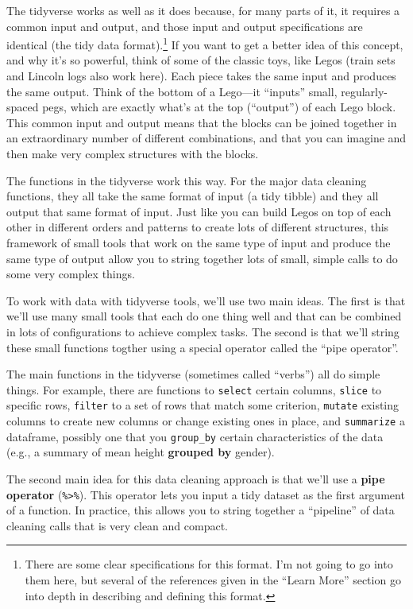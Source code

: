\documentclass[]{tufte-book}
\begin{document}
The tidyverse works as well as it does because, for many parts of it, it requires
a common input and output, and those input and output specifications are
identical (the tidy data format).\footnote{There are some clear specifications for this
  format. I'm not going to go into them here, but several of the references given
  in the ``Learn More'' section go into depth in describing and defining this format.}
If you want to get a better idea of this concept, and why it's so powerful,
think of some of the
classic toys, like Legos (train sets and Lincoln logs also
work here). Each piece takes the same input and produces the same output. Think of
the bottom of a Lego---it ``inputs'' small, regularly-spaced pegs, which are exactly
what's at the top (``output'') of each Lego block. This common input and output
means that the blocks can be joined together in an extraordinary number of
different combinations, and that you can imagine and then make very complex
structures with the blocks.

The functions in the tidyverse work this way. For the major data cleaning functions,
they all take the same format of input (a tidy tibble) and they all output that
same format of input. Just like you can build Legos on top of each other in different
orders and patterns to create lots of different structures, this framework of
small tools that work on the same type of input and produce the same type of output
allow you to string together lots of small, simple calls to do some very complex things.

To work with data with tidyverse tools, we'll use two main ideas.
The first is that we'll use many small tools that each do one thing well and that
can be combined in lots of configurations to achieve complex tasks. The second is
that we'll string these small functions togther using a special operator
called the ``pipe operator''.

The main functions in the tidyverse (sometimes called ``verbs'') all do simple things.
For example, there are functions to \texttt{select} certain columns, \texttt{slice} to specific
rows, \texttt{filter} to a set of rows that match some criterion, \texttt{mutate} existing columns
to create new columns or change existing ones in place, and \texttt{summarize} a dataframe,
possibly one that you \texttt{group\_by} certain characteristics of the data (e.g., a summary
of mean height \textbf{grouped by} gender).

The second main idea for this data cleaning approach is that we'll use a
\textbf{pipe operator} (\texttt{\%\textgreater{}\%}). This operator lets you input a tidy dataset as the first
argument of a function. In practice, this allows you to string together a ``pipeline'' of
data cleaning calls that is very clean and compact.
\end{document}
